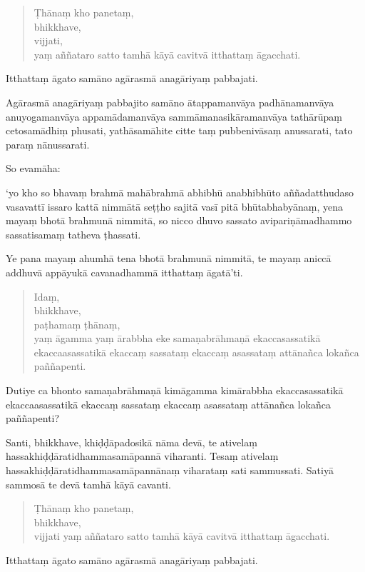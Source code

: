 \documentclass[11pt,twoside,openright]{book}
\begin{document}
\begin{verse}
Ṭhānaṃ kho panetaṃ,\\
\vin  bhikkhave,\\
\vin  vijjati,\\
\vin  yaṃ aññataro satto tamhā kāyā cavitvā itthattaṃ āgacchati.

\end{verse}
\pstart
Itthattaṃ āgato samāno agārasmā anagāriyaṃ pabbajati.
\pend

\pstart
Agārasmā anagāriyaṃ pabbajito samāno ātappamanvāya padhānamanvāya anuyogamanvāya appamādamanvāya sammāmanasikāramanvāya tathārūpaṃ cetosamādhiṃ phusati, yathāsamāhite citte taṃ pubbenivāsaṃ anussarati, tato paraṃ nānussarati.
\pend

\pstart
So evamāha:
\pend

\pstart
‘yo kho so bhavaṃ brahmā mahābrahmā abhibhū anabhibhūto aññadatthudaso vasavattī issaro kattā nimmātā seṭṭho sajitā vasī pitā bhūtabhabyānaṃ, yena mayaṃ bhotā brahmunā nimmitā, so nicco dhuvo sassato avipariṇāmadhammo sassatisamaṃ tatheva ṭhassati.
\pend

\pstart
Ye pana mayaṃ ahumhā tena bhotā brahmunā nimmitā, te mayaṃ aniccā addhuvā appāyukā cavanadhammā itthattaṃ āgatā’ti.
\pend

\begin{verse}
Idaṃ,\\
\vin  bhikkhave,\\
\vin  paṭhamaṃ ṭhānaṃ,\\
\vin  yaṃ āgamma yaṃ ārabbha eke samaṇabrāhmaṇā ekaccasassatikā ekaccaasassatikā ekaccaṃ sassataṃ ekaccaṃ asassataṃ attānañca lokañca paññapenti.

\end{verse}
\pstart
Dutiye ca bhonto samaṇabrāhmaṇā kimāgamma kimārabbha ekaccasassatikā ekaccaasassatikā ekaccaṃ sassataṃ ekaccaṃ asassataṃ attānañca lokañca paññapenti?
\pend

\pstart
Santi, bhikkhave, khiḍḍāpadosikā nāma devā, te ativelaṃ hassakhiḍḍāratidhammasamāpannā viharanti. Tesaṃ ativelaṃ hassakhiḍḍāratidhammasamāpannānaṃ viharataṃ sati sammussati. Satiyā sammosā te devā tamhā kāyā cavanti.
\pend

\begin{verse}
Ṭhānaṃ kho panetaṃ,\\
\vin  bhikkhave,\\
\vin  vijjati yaṃ aññataro satto tamhā kāyā cavitvā itthattaṃ āgacchati.

\end{verse}
\pstart
Itthattaṃ āgato samāno agārasmā anagāriyaṃ pabbajati.
\pend
\end{document}
